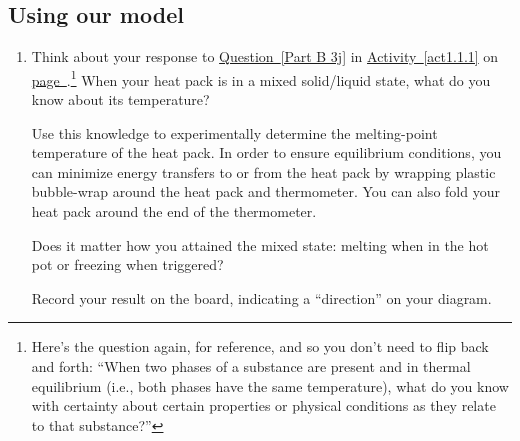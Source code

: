 
\subsection{Using our model}
\label{act1.1.2B.3}

\begin{enumerate}
	\item Think about your response to \hyperref[Part B 3j]{Question~\ref*{Part B 3j}} in \hyperref[act1.1.1]{Activity~\ref*{act1.1.1}} on \hyperref[Part B 3j]{page~\pageref{Part B 3j}}.\footnote{Here's the question again, for reference, and so you don't need to flip back and forth: ``When two phases of a substance are present and in thermal equilibrium (i.e., both phases have the same temperature), what do you know with certainty about certain properties or physical conditions as they relate to that substance?''} When your heat pack is in a mixed solid/liquid state, what do you know about its temperature?
	
		Use this knowledge to experimentally determine the melting-point temperature of the heat pack. In order to ensure equilibrium conditions, you can minimize energy transfers to or from the heat pack by wrapping plastic bubble-wrap around the heat pack and thermometer. You can also fold your heat pack around the end of the thermometer.
		
		Does it matter how you attained the mixed state: melting when in the hot pot or freezing when triggered?
		
		Record your result on the board, indicating a ``direction'' on your diagram.
	
	

\end{enumerate}
